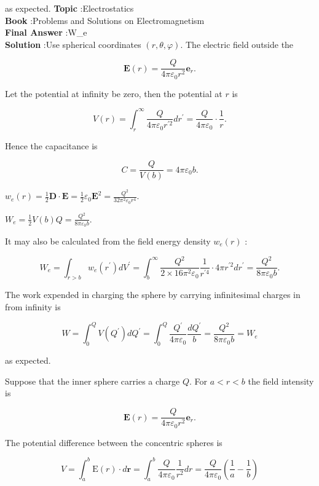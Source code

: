 \documentclass[10pt]{article}
\begin{document}
as expected.
\textbf{Topic} :Electrostatics\\
\textbf{Book} :Problems and Solutions on Electromagnetism\\
\textbf{Final Answer} :W_{e}\\


\textbf{Solution} :Use spherical coordinates $(r, \theta, \varphi)$. The electric field outside the

$$
\mathbf{E}(r)=\frac{Q}{4 \pi \varepsilon_{0} r^{2}} \mathbf{e}_{r} .
$$

Let the potential at infinity be zero, then the potential at $r$ is

$$
V(r)=\int_{r}^{\infty} \frac{Q}{4 \pi \varepsilon_{0} r^{\prime 2}} d r^{\prime}=\frac{Q}{4 \pi \varepsilon_{0}} \cdot \frac{1}{r} .
$$



Hence the capacitance is

$$
C=\frac{Q}{V(b)}=4 \pi \varepsilon_{0} b .
$$

 $w_{e}(r)=\frac{1}{2} \mathbf{D} \cdot \mathbf{E}=\frac{1}{2} \varepsilon_{0} \mathbf{E}^{2}=\frac{Q^{2}}{32 \pi^{2} \varepsilon_{0} r^{4}}$.

 $W_{e}=\frac{1}{2} V(b) Q=\frac{Q^{2}}{8 \pi \varepsilon_{0} b}$.

It may also be calculated from the field energy density $w_{e}(r)$ :

$$
W_{e}=\int_{r>b} w_{e}\left(r^{\prime}\right) d V^{\prime}=\int_{b}^{\infty} \frac{Q^{2}}{2 \times 16 \pi^{2} \varepsilon_{0}} \frac{1}{r^{\prime 4}} \cdot 4 \pi r^{\prime 2} d r^{\prime}=\frac{Q^{2}}{8 \pi \varepsilon_{0} b} .
$$

 The work expended in charging the sphere by carrying infinitesimal charges in from infinity is

$$
W=\int_{0}^{Q} V\left(Q^{\prime}\right) d Q^{\prime}=\int_{0}^{Q} \frac{Q^{\prime}}{4 \pi \varepsilon_{0}} \frac{d Q^{\prime}}{b}=\frac{Q^{2}}{8 \pi \varepsilon_{0} b}=W_{e}
$$

as expected.

 Suppose that the inner sphere carries a charge $Q$. For $a<r<b$ the field intensity is

$$
\mathbf{E}(r)=\frac{Q}{4 \pi \varepsilon_{0} r^{2}} \mathbf{e}_{r} .
$$

The potential difference between the concentric spheres is

$$
V=\int_{a}^{b} \mathrm{E}(r) \cdot d \mathbf{r}=\int_{a}^{b} \frac{Q}{4 \pi \varepsilon_{0}} \frac{1}{r^{2}} d r=\frac{Q}{4 \pi \varepsilon_{0}}\left(\frac{1}{a}-\frac{1}{b}\right)
$$
\end{document}

